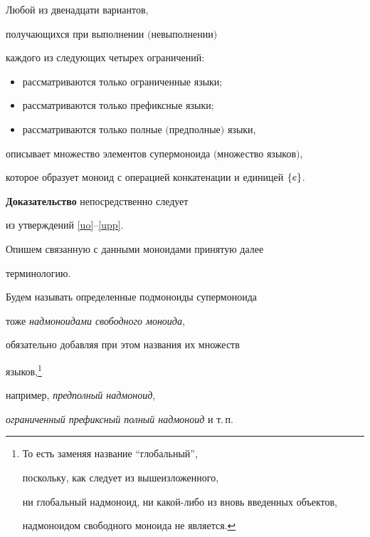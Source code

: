  \begin{thms} \label{PM}


 Любой из двенадцати вариантов,


 получающихся при выполнении $($не\-вы\-пол\-не\-нии$)$


 каждого из следующих четырех ограничений\/${:}$


 \begin{itemize}


 \item рассматриваются только ограниченные языки$;$


 \item рассматриваются только префиксные языки$;$


 \item рассматриваются только полные $($предполные$)$ языки,


 \end{itemize}


 описывает множество элементов супермоноида $($множество языков$)$,


 которое образует моноид с операцией конкатенации и единицей $\{ e \}$.


 \end{thms}





{\bf Доказательство} непосредственно следует


 из утверждений \ref{uo}--\ref{upp}.


\medskip





 Опишем связанную с данными моноидами принятую далее


терминологию. \label{termino}


 Будем называть определенные подмоноиды супермоноида


 тоже {\it надмоноидами свободного моноида\/},


 обязательно добавляя при этом названия их множеств


языков,\footnote{То есть заменяя название ``глобальный'',


 поскольку, как следует из вышеизложенного,


 ни глобальный надмоноид, ни какой-либо из вновь введенных объектов,


 надмоноидом свободного моноида не является.}


 например, {\it предполный надмоноид\/},


 {\it ограниченный префиксный полный надмоноид\/} и т.\,п.


